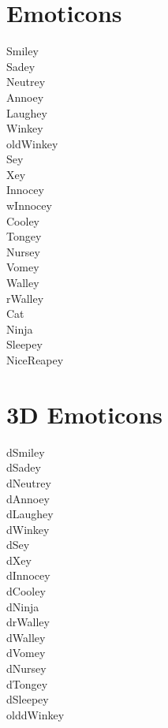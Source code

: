 \documentclass[]{article}
\begin{document}
\section{Emoticons}

\begin{flushleft}
Smiley \Smiley \\
Sadey \Sadey \\
Neutrey \Neutrey \\
Annoey \Annoey \\
Laughey \Laughey \\
Winkey \Winkey \\
oldWinkey \oldWinkey \\
Sey \Sey \\
Xey \Xey \\
Innocey \Innocey \\
wInnocey \wInnocey \\
Cooley \Cooley \\
Tongey \Tongey \\
Nursey \Nursey \\
Vomey \Vomey \\
Walley \Walley \\
rWalley \rWalley \\
Cat \Cat \\
Ninja \Ninja \\
Sleepey \Sleepey \\
NiceReapey \NiceReapey \\
\end{flushleft}


\section{3D Emoticons}

\begin{flushleft}
dSmiley \dSmiley \\
dSadey \dSadey \\
dNeutrey \dNeutrey \\
dAnnoey \dAnnoey \\
dLaughey \dLaughey \\
dWinkey \dWinkey \\
dSey \dSey \\
dXey \dXey \\
dInnocey \dInnocey \\
dCooley \dCooley \\
dNinja \dNinja \\
drWalley \drWalley \\
dWalley \dWalley \\
dVomey \dVomey \\
dNursey \dNursey \\
dTongey \dTongey \\
dSleepey \dSleepey \\
olddWinkey \olddWinkey \\
\end{flushleft}
\end{document}
